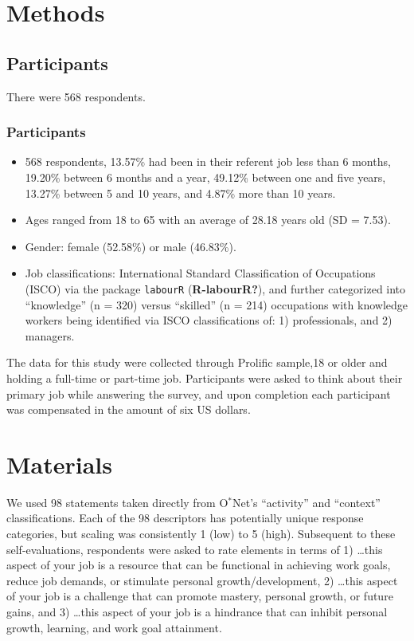 \documentclass[
  man]{apa6}
\providecommand{\tightlist}{%
  \setlength{\itemsep}{0pt}\setlength{\parskip}{0pt}}
\begin{document}
\hypertarget{methods}{%
\section{Methods}\label{methods}}

\hypertarget{participants}{%
\subsection{Participants}\label{participants}}

There were 568 respondents.

\hypertarget{participants-1}{%
\subsubsection{Participants}\label{participants-1}}

\begin{itemize}
\tightlist
\item
  568 respondents, 13.57\% had been in their referent job less than 6 months, 19.20\% between 6 months and a year, 49.12\% between one and five years, 13.27\% between 5 and 10 years, and 4.87\% more than 10 years.
\item
  Ages ranged from 18 to 65 with an average of 28.18 years old (SD = 7.53).
\item
  Gender: female (52.58\%) or male (46.83\%).
\item
  Job classifications: International Standard Classification of Occupations (ISCO) via the package \texttt{labourR} (\textbf{R-labourR?}), and further categorized into ``knowledge'' (n = 320) versus ``skilled'' (n = 214) occupations with knowledge workers being identified via ISCO classifications of: 1) professionals, and 2) managers.
\end{itemize}

The data for this study were collected through Prolific sample,18 or older and holding a full-time or part-time job. Participants were asked to think about their primary job while answering the survey, and upon completion each participant was compensated in the amount of six US dollars.

\hypertarget{materials}{%
\section{Materials}\label{materials}}

We used 98 statements taken directly from O\(^{*}\)Net's ``activity'' and ``context'' classifications. Each of the 98 descriptors has potentially unique response categories, but scaling was consistently 1 (low) to 5 (high). Subsequent to these self-evaluations, respondents were asked to rate elements in terms of 1) \ldots this aspect of your job is a resource that can be functional in achieving work goals, reduce job demands, or stimulate personal growth/development, 2) \ldots this aspect of your job is a challenge that can promote mastery, personal growth, or future gains, and 3) \ldots this aspect of your job is a hindrance that can inhibit personal growth, learning, and work goal attainment.
\end{document}

